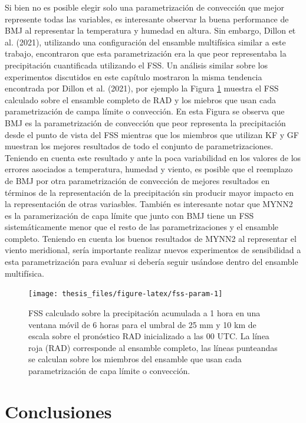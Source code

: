 \documentclass[12pt,oneside,a4paper]{reedthesis}
\begin{document}
Si bien no es posible elegir solo una parametrización de convección que mejor represente todas las variables, es interesante observar la buena performance de BMJ al representar la temperatura y humedad en altura. Sin embargo, Dillon et al. (2021), utilizando una configuración del ensamble multifísica similar a este trabajo, encontraron que esta parametrización era la que peor representaba la precipitación cuantificada utilizando el FSS. Un análisis similar sobre los experimentos discutidos en este capítulo mostraron la misma tendencia encontrada por Dillon et al. (2021), por ejemplo la Figura \ref{fig:fss-param} muestra el FSS calculado sobre el ensamble completo de RAD y los miebros que usan cada parametrización de campa límite o convección. En esta Figura se observa que BMJ es la parametrización de convección que peor representa la precipitación desde el punto de vista del FSS mientras que los miembros que utilizan KF y GF muestran los mejores resultados de todo el conjunto de parametrizaciones. Teniendo en cuenta este resultado y ante la poca variabilidad en los valores de los errores asociados a temperatura, humedad y viento, es posible que el reemplazo de BMJ por otra parametrización de convección de mejores resultados en términos de la representación de la precipitación sin producir mayor impacto en la representación de otras variasbles. También es interesante notar que MYNN2 es la paramerización de capa límite que junto con BMJ tiene un FSS sistemáticamente menor que el resto de las parametrizaciones y el ensamble completo. Teniendo en cuenta los buenos resultados de MYNN2 al representar el viento meridional, sería importante realizar nuevos experimentos de sensibilidad a esta parametrización para evaluar si debería seguir usándose dentro del ensamble multifísica.




\begin{figure}

\texttt{[image: thesis\_files/figure-latex/fss-param-1]} \hfill{}

\caption{FSS calculado sobre la precipitación acumulada a 1 hora en una ventana móvil de 6 horas para el umbral de 25 mm y 10 km de escala sobre el pronóstico RAD inicializado a las 00 UTC. La línea roja (RAD) corresponde al ensamble completo, las líneas punteandas se calculan sobre los miembros del ensamble que usan cada parametrización de capa límite o convección.}\label{fig:fss-param}
\end{figure}
\hypertarget{conclusiones-1}{%
\section{Conclusiones}\label{conclusiones-1}}
\end{document}

